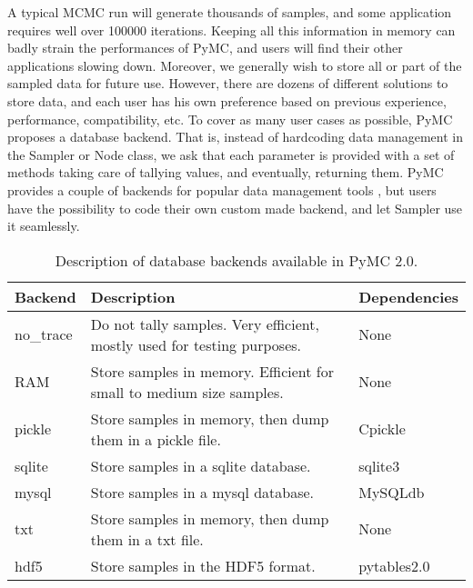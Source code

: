 

A typical MCMC run will generate thousands of samples, and some application requires well over 100000 iterations. Keeping all this information in memory can badly strain the performances of PyMC, and users will find their other applications slowing down. Moreover, we generally wish to store all or part of the sampled data for future use. However, there are dozens of different solutions to store data, and each user has his own preference based on previous experience, performance, compatibility, etc. To cover as many user cases as possible, PyMC proposes a database backend. That is, instead of hardcoding data management in the Sampler or Node class, we ask that each parameter is provided with a set of methods taking care of tallying values, and eventually, returning them. PyMC provides a couple of backends for popular data management tools , but users have the possibility to code their own custom made backend, and let Sampler use it seamlessly.

\leavevmode
\begin{longtable}[c]{|p{0.121\locallinewidth}|p{0.598\locallinewidth}|p{0.203\locallinewidth}|}
\caption{Description of database backends available in PyMC 2.0.}\\
\hline
\textbf{
Backend
} & \textbf{
Description
} & \textbf{
Dependencies
} \\
\hline
\endhead

no{\_}trace
 & 
Do not tally samples. Very efficient, mostly used
for testing purposes.
 & 
None
 \\
\hline

RAM
 & 
Store samples in memory. Efficient for small to
medium size samples.
 & 
None
 \\
\hline

pickle
 & 
Store samples in memory, then dump them in a
pickle file.
 & 
Cpickle
 \\
\hline

sqlite
 & 
Store samples in a sqlite database.
 & 
sqlite3
 \\
\hline

mysql
 & 
Store samples in a mysql database.
 & 
MySQLdb
 \\
\hline

txt
 & 
Store samples in memory, then dump them in a txt
file.
 & 
None
 \\
\hline

hdf5
 & 
Store samples in the HDF5 format.
 & 
pytables2.0
 \\
\hline
\end{longtable}

